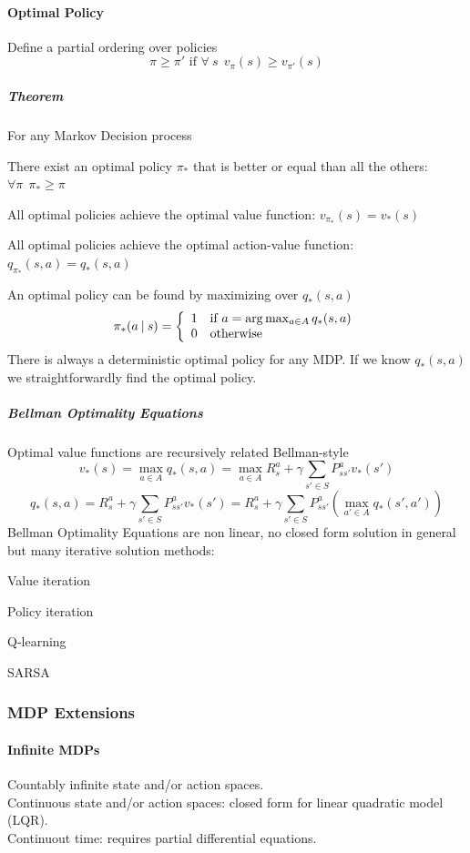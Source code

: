 \documentclass[10pt]{report}
\begin{document}
\paragraph{Optimal Policy} Define a partial ordering over policies $$\pi\geq \pi'\text{ if }\forall\:s\:\:v_\pi(s)\geq v_{\pi'}(s)$$
\subparagraph{Theorem} For any Markov Decision process\begin{list}{}{}
	\item There exist an optimal policy $\pi_*$ that is better or equal than all the others: $\forall\pi\:\:\pi_*\geq \pi$
	\item All optimal policies achieve the optimal value function: $v_{\pi_*}(s) = v_*(s)$
	\item All optimal policies achieve the optimal action-value function: $q_{\pi_*}(s,a) = q_*(s,a)$
\end{list}
An optimal policy can be found by maximizing over $q_*(s,a)$
$$\pi_*(a\:|\:s)=\left\{\begin{array}{l l}
1&\text{if }a=\arg\max_{a\in A} q_*(s,a)\\
0&\text{otherwise}
\end{array}\right.$$
There is always a deterministic optimal policy for any MDP. If we know $q_*(s,a)$ we straightforwardly find the optimal policy.
\subparagraph{Bellman Optimality Equations} Optimal value functions are recursively related Bellman-style
$$v_*(s)= \max_{a\in A}q_*(s,a) = \max_{a\in A}R_s^a + \gamma\sum_{s'\in S}P_{ss'}^av_*(s')$$
$$q_*(s,a)=R_s^a + \gamma\sum_{s'\in S} P_{ss'}^av_*(s') = R_s^a + \gamma\sum_{s'\in S}P_{ss'}^a\left(\max_{a'\in A}q_*(s',a')\right)$$
Bellman Optimality Equations are non linear, no closed form solution in general but many iterative solution methods:
\begin{list}{}{}
	\item Value iteration
	\item Policy iteration
	\item Q-learning
	\item SARSA
\end{list}
\subsubsection{MDP Extensions}
\paragraph{Infinite MDPs} Countably infinite state and/or action spaces.\\
Continuous state and/or action spaces: closed form for linear quadratic model (LQR).\\
Continuout time: requires partial differential equations.
\end{document}
